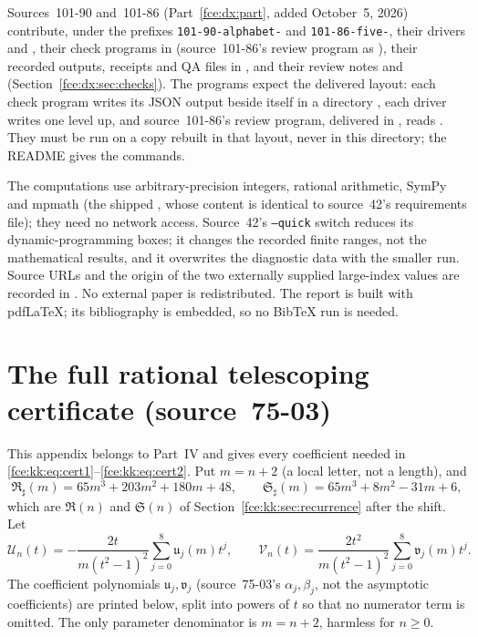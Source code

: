 \documentclass[11pt,a4paper]{article}
\numberwithin{equation}{section}
\theoremstyle{definition}\newtheorem{definition}[theorem]{Definition}
\theoremstyle{remark}\newtheorem{remark}[theorem]{Remark}
\begin{document}
Sources~101-90 and~101-86 (Part~\ref{fce:dx:part}, added October~5, 2026)
contribute, under the prefixes \texttt{101-90-alphabet-} and
\texttt{101-86-five-}, their drivers 
and , their check programs in
 (source~101-86's review program as
), their recorded
outputs, receipts and QA files in , and their review notes
 and
 (Section~\ref{fce:dx:sec:checks}).
The programs expect the delivered layout: each check program writes its JSON
output beside itself in a directory , each driver writes
 one level up, and source~101-86's review program,
delivered in , reads . They
must be run on a copy rebuilt in that layout, never in this directory; the
README gives the commands.

The computations use arbitrary-precision integers, rational arithmetic,
SymPy and mpmath (the shipped ,
whose content is identical to source~42's requirements file); they need no
network access. Source~42's \texttt{--quick} switch reduces its
dynamic-programming boxes; it changes the recorded finite ranges, not the
mathematical results, and it overwrites the diagnostic data with the
smaller run. Source URLs and the origin of the two externally supplied
large-index values are recorded in . No
external paper is redistributed. The report is built with pdf\LaTeX; its
bibliography is embedded, so no BibTeX run is needed.

\section{The full rational telescoping certificate (source~75-03)}\label{fce:kk:app:certificate}
This appendix belongs to Part~IV and gives every coefficient needed in
\eqref{fce:kk:eq:cert1}--\eqref{fce:kk:eq:cert2}. Put $m=n+2$ (a local
letter, not a length), and
\[
 \mathfrak R_\sharp(m)=65m^3+203m^2+180m+48,\qquad
 \mathfrak S_\sharp(m)=65m^3+8m^2-31m+6,
\]
which are $\mathfrak R(n)$ and $\mathfrak S(n)$ of
Section~\ref{fce:kk:sec:recurrence} after the shift. Let
\begin{equation}\label{fce:kk:eq:certificateUV}
 \mathscr U_n(t)=-\frac{2t}{m(t^2-1)^2}\sum_{j=0}^8\mathfrak u_j(m)t^j,
 \qquad
 \mathscr V_n(t)=\frac{2t^2}{m(t^2-1)^2}\sum_{j=0}^8\mathfrak v_j(m)t^j.
\end{equation}
The coefficient polynomials $\mathfrak u_j,\mathfrak v_j$ (source~75-03's
$\alpha_j,\beta_j$, not the asymptotic coefficients) are printed below,
split into powers of $t$ so that no numerator term is omitted. The only
parameter denominator is $m=n+2$, harmless for $n\ge0$.
\end{document}
